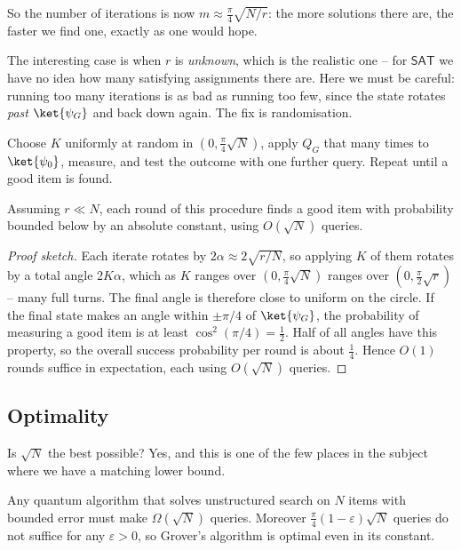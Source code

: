 So the number of iterations is now $m\approx\frac\pi4\sqrt{N/r}$: the more solutions there are, the faster we find one, exactly as one would hope.

The interesting case is when $r$ is \emph{unknown}, which is the realistic one -- for $\mathsf{SAT}$ we have no idea how many satisfying assignments there are. Here we must be careful: running too many iterations is as bad as running too few, since the state rotates \emph{past} $\ket{\psi_G}$ and back down again. The fix is randomisation.

\begin{method}
	Choose $K$ uniformly at random in $\left(0,\tfrac\pi4\sqrt N\right)$, apply $Q_G$ that many times to $\ket{\psi_0}$, measure, and test the outcome with one further query. Repeat until a good item is found.
\end{method}

\begin{proposition}
	Assuming $r\ll N$, each round of this procedure finds a good item with probability bounded below by an absolute constant, using $O(\sqrt N)$ queries.
\end{proposition}

\begin{proof}[Proof sketch]
	Each iterate rotates by $2\alpha\approx2\sqrt{r/N}$, so applying $K$ of them rotates by a total angle $2K\alpha$, which as $K$ ranges over $(0,\tfrac\pi4\sqrt N)$ ranges over $(0,\tfrac\pi2\sqrt r)$ -- many full turns. The final angle is therefore close to uniform on the circle. If the final state makes an angle within $\pm\pi/4$ of $\ket{\psi_G}$, the probability of measuring a good item is at least $\cos^2(\pi/4) = \tfrac12$. Half of all angles have this property, so the overall success probability per round is about $\tfrac14$. Hence $O(1)$ rounds suffice in expectation, each using $O(\sqrt N)$ queries.
\end{proof}

\subsection{Optimality}

Is $\sqrt N$ the best possible? Yes, and this is one of the few places in the subject where we have a matching lower bound.

\begin{theorem}[BBBV]
	Any quantum algorithm that solves unstructured search on $N$ items with bounded error must make $\Omega(\sqrt N)$ queries. Moreover $\frac\pi4(1-\varepsilon)\sqrt N$ queries do not suffice for any $\varepsilon>0$, so Grover's algorithm is optimal even in its constant.
\end{theorem}

